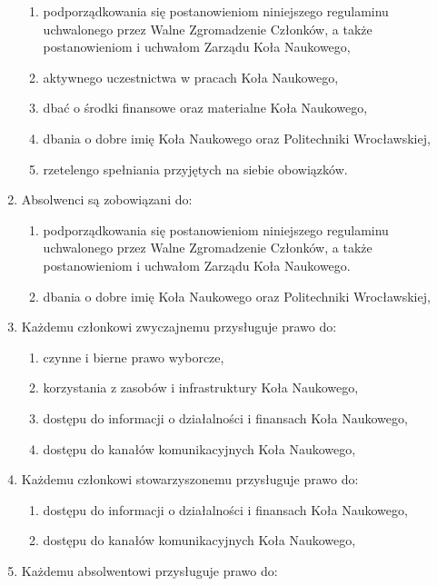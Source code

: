 \documentclass[12pt,a4paper]{article}
\begin{document}
\begin{enumerate}
\begin{enumerate}
                \item podporządkowania się postanowieniom niniejszego regulaminu uchwalonego przez Walne Zgromadzenie Członków, a także postanowieniom i uchwałom Zarządu Koła Naukowego,
                \item aktywnego uczestnictwa w pracach Koła Naukowego,
                \item dbać o środki finansowe oraz materialne Koła Naukowego,
                \item dbania o dobre imię Koła Naukowego oraz Politechniki Wrocławskiej,
                \item rzetelengo spełniania przyjętych na siebie obowiązków.
            \end{enumerate}
        \item Absolwenci są zobowiązani do:
            \begin{enumerate}
                \item podporządkowania się postanowieniom niniejszego regulaminu uchwalonego przez Walne Zgromadzenie Członków, a także postanowieniom i uchwałom Zarządu Koła Naukowego.
                \item dbania o dobre imię Koła Naukowego oraz Politechniki Wrocławskiej,
            \end{enumerate}
        \item Każdemu członkowi zwyczajnemu przysługuje prawo do:
            \begin{enumerate}
                \item czynne i bierne prawo wyborcze,
                \item korzystania z zasobów i infrastruktury Koła Naukowego,
                \item dostępu do informacji o działalności i finansach Koła Naukowego,
                \item dostępu do kanałów komunikacyjnych Koła Naukowego,
            \end{enumerate}
        \item Każdemu członkowi stowarzyszonemu przysługuje prawo do:
            \begin{enumerate}
                \item dostępu do informacji o działalności i finansach Koła Naukowego,
                \item dostępu do kanałów komunikacyjnych Koła Naukowego,
            \end{enumerate}
        \item Każdemu absolwentowi przysługuje prawo do:

\end{enumerate}
\end{document}
